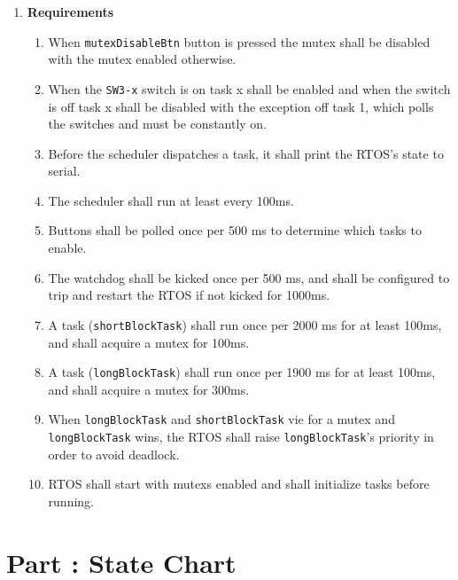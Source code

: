 \documentclass{article}
\newcounter{partNum}
\newcommand{\partNum}{%
        \stepcounter{partNum}%
        \thepartNum}
\newcommand{\sectPart}[1]{\section*{Part \partNum: #1}}
\newcommand{\bitem}[1]{\item \textbf{#1}}
\begin{document}
\begin{enumerate}
\bitem{Requirements}
    \begin{enumerate}
    \item When \texttt{mutexDisableBtn} button is pressed the mutex shall be disabled with the mutex enabled otherwise.
    \item When the \texttt{SW3-x} switch is on task x shall be enabled and when the switch is off task x shall be disabled with the exception off task 1, which polls the switches and must be constantly on.
    \item Before the scheduler dispatches a task, it shall print the RTOS's state to serial.
    \item The scheduler shall run at least every 100ms.
    \item Buttons shall be polled once per 500 ms to determine which tasks to enable.
    \item The watchdog shall be kicked once per 500 ms, and shall be configured to trip and restart the RTOS if not kicked for 1000ms.
    \item A task (\texttt{shortBlockTask}) shall run once per 2000 ms for at least 100ms, and shall acquire a mutex for 100ms.
    \item A task (\texttt{longBlockTask}) shall run once per 1900 ms for at least 100ms, and shall acquire a mutex for 300ms.
    \item When \texttt{longBlockTask} and \texttt{shortBlockTask} vie for a mutex and \texttt{longBlockTask} wins, the RTOS shall raise \texttt{longBlockTask}'s priority in order to avoid deadlock.
    \item RTOS shall start with mutexs enabled and shall initialize tasks before running.
    \end{enumerate}
\end{enumerate}


\sectPart{State Chart}
\end{document}
